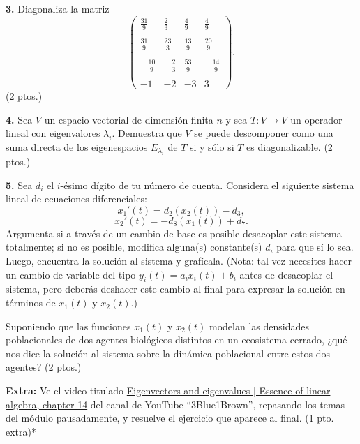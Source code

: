 \documentclass[a4paper]{article}
\begin{document}
\vspace{5mm}
\textbf{3.} Diagonaliza la matriz $$\begin{pmatrix} \frac{31}{9} & \frac{2}{3} & \frac{4}{9} & \frac{4}{9} \\ \\ \frac{31}{9} & \frac{23}{3} & \frac{13}{9} & \frac{20}{9} \\ \\ -\frac{10}{9} & -\frac{2}{3} & \frac{53}{9} & -\frac{14}{9} \\ \\ -1 & -2 & -3 & 3 \end{pmatrix}  .$$ (2 ptos.)

\vspace{5mm}
\textbf{4.} Sea $V$ un espacio vectorial de dimensión finita $n$ y sea $T:V\to V$ un operador lineal con eigenvalores $\lambda_i$. Demuestra que $V$ se puede descomponer como  una suma directa de los eigenespacios $E_{\lambda_i}$ de $T$ si y sólo si $T$ es diagonalizable. (2 ptos.)

\vspace{5mm}
\textbf{5.} Sea $d_i$ el $i$-ésimo dígito de tu número de cuenta. Considera el siguiente sistema lineal de ecuaciones diferenciales: $$x_1'(t) = d_2(x_2(t)) - d_3,$$ $$x_2'(t)= -d_8(x_1(t)) + d_7.$$ \noindent Argumenta si a través de un cambio de base es posible desacoplar este sistema totalmente; si no es posible, modifica alguna(s) constante(s) $d_i$ para que sí lo sea. Luego, encuentra la solución al sistema y grafícala. (Nota: tal vez necesites hacer un cambio de variable del tipo $y_i(t)=a_i x_i(t)+b_i$ antes de desacoplar el sistema, pero deberás deshacer este cambio al final para expresar la solución en términos de $x_1(t)$ y $x_2(t)$.)

Suponiendo que las funciones $x_1(t)$ y $x_2(t)$ modelan las densidades poblacionales de dos agentes biológicos distintos en un ecosistema cerrado, ¿qué nos dice la solución al sistema sobre la dinámica poblacional entre estos dos agentes? (2 ptos.)

\vspace{5mm}
\textbf{Extra:} Ve el video titulado \href{https://www.youtube.com/watch?v=PFDu9oVAE-g&list=PLZHQObOWTQDPD3MizzM2xVFitgF8hE_ab&index=14}{Eigenvectors and eigenvalues | Essence of linear algebra, chapter 14} del canal de YouTube ``3Blue1Brown'', repasando los temas del módulo pausadamente, y resuelve el ejercicio que aparece al final. (1 pto. extra)*
\end{document}
